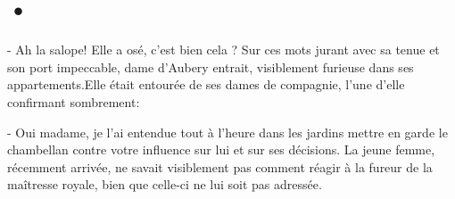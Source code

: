 \documentclass[11pt,a4paper]{book}
\begin{document}
\chapter{•}
- Ah la salope! Elle a osé, c'est bien cela ? Sur ces mots jurant avec sa tenue et son port impeccable, dame d'Aubery entrait, visiblement furieuse dans ses appartements.Elle était entourée de ses dames de compagnie, l'une d'elle confirmant sombrement: 

- Oui madame, je l'ai entendue tout à l'heure dans les jardins mettre en garde le chambellan contre votre influence sur lui et sur ses décisions. La jeune femme, récemment arrivée, ne savait visiblement pas comment réagir à la fureur de la maîtresse royale, bien que celle-ci ne lui soit pas adressée.
\end{document}
